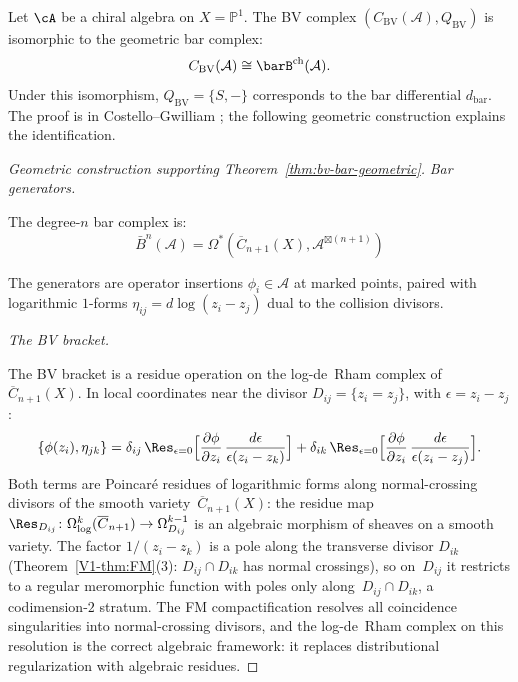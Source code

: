 \begin{theorem}[BV complex $=$ geometric bar complex; \ClaimStatusProvedElsewhere{} \cite{CG17}]
\label{thm:bv-bar-geometric}
Let $\cA$ be a chiral algebra on $X = \mathbb{P}^1$. The BV complex
$(C_{\mathrm{BV}}(\mathcal{A}), Q_{\mathrm{BV}})$ is isomorphic to the
geometric bar complex:
\[
C_{\mathrm{BV}}(\mathcal{A}) \cong \barB^{\mathrm{ch}}(\mathcal{A}).
\]
Under this isomorphism, $Q_{\mathrm{BV}} = \{S, -\}$ corresponds to the bar
differential $d_{\mathrm{bar}}$. The proof is in Costello--Gwilliam
\cite{CG17}; the following geometric construction explains the
identification.
\end{theorem}

\begin{proof}[Geometric construction supporting \textup{Theorem~\ref{thm:bv-bar-geometric}}]
\emph{Bar generators.}

The degree-$n$ bar complex is:
\[\bar{B}^n(\mathcal{A}) = \Omega^*(\overline{C}_{n+1}(X), \mathcal{A}^{\boxtimes (n+1)})\]

The generators are operator insertions $\phi_i \in \mathcal{A}$ at marked points, paired with logarithmic $1$-forms $\eta_{ij} = d\log(z_i - z_j)$ dual to the collision divisors.

\emph{The BV bracket.}

The BV bracket is a residue operation on the log-de~Rham complex
of~$\overline{C}_{n+1}(X)$. In local coordinates near the divisor
$D_{ij} = \{z_i = z_j\}$, with $\epsilon = z_i - z_j$:
\[\{\phi(z_i), \eta_{jk}\}
= \delta_{ij}\,\Res_{\epsilon = 0}
\Bigl[\frac{\partial\phi}{\partial z_i}\,
\frac{d\epsilon}{\epsilon(z_i - z_k)}\Bigr]
+ \delta_{ik}\,\Res_{\epsilon = 0}
\Bigl[\frac{\partial\phi}{\partial z_i}\,
\frac{d\epsilon}{\epsilon(z_i - z_j)}\Bigr].\]
Both terms are Poincar\'e residues of logarithmic forms along
normal-crossing divisors of the smooth
variety~$\overline{C}_{n+1}(X)$: the residue map
$\Res_{D_{ij}}\colon \Omega^k_{\log}(\overline{C}_{n+1})
\to \Omega^{k-1}_{D_{ij}}$ is an algebraic morphism of sheaves
on a smooth variety. The factor $1/(z_i - z_k)$ is a pole along
the transverse divisor $D_{ik}$ (Theorem~\ref{V1-thm:FM}(3):
$D_{ij} \cap D_{ik}$ has normal crossings), so on~$D_{ij}$
it restricts to a regular meromorphic function with poles only
along~$D_{ij} \cap D_{ik}$, a codimension-$2$ stratum.
The FM compactification resolves all coincidence singularities
into normal-crossing divisors, and the log-de~Rham complex on
this resolution is the correct algebraic framework: it replaces
distributional regularization with algebraic residues.


\end{proof}
